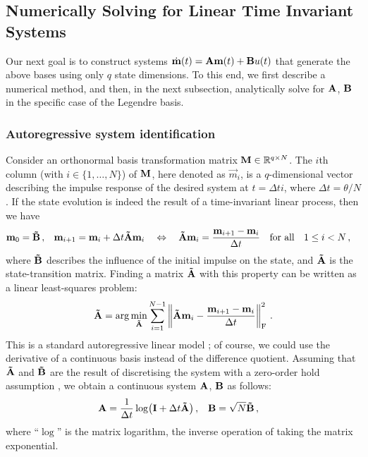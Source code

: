 \subsection{Numerically Solving for Linear Time Invariant Systems}
\label{sec:lti_autoregression}

Our next goal is to construct \LTI systems $\dot{\mathbf{m}}(t) = \mathbf{A} \mathbf{m}(t) + \mathbf{B} u(t)$ that generate the above bases using only $q$ state dimensions.
To this end, we first describe a numerical method, and then, in the next subsection, analytically solve for $\mathbf{A}$, $\mathbf{B}$ in the specific case of the Legendre basis.

\subsubsection{Autoregressive system identification}
Consider an orthonormal basis transformation matrix $\mathbf{M} \in \mathbb{R}^{q \times N}$. The $i$th column (with $i \in \{1, \ldots, N\}$) of $\mathbf{M}$, here denoted as $\vec m_i$, is a $q$-dimensional vector describing the impulse response of the desired system at $t = \Delta t i$, where $\Delta t = \theta / N$.
If the state evolution is indeed the result of a time-invariant linear process, then we have
\begin{align*}
	\mathbf{m}_0 &= \mathbf{\tilde B} \,, &
	\mathbf{m}_{i + 1} &= \mathbf{m}_{i} + \Delta t \mathbf{\tilde A} \mathbf{m}_i
	\quad \Leftrightarrow \quad
	\mathbf{\tilde A} \mathbf{m}_{i} = \frac{\mathbf{m}_{i + 1} - \mathbf{m}_i}{\Delta t} \quad \text{for all} \quad 1 \leq i < N \,,
\end{align*}
where $\mathbf{\tilde B}$ describes the influence of the initial impulse on the state, and $\mathbf{\tilde A}$ is the state-transition matrix.
Finding a matrix $\mathbf{\tilde A}$ with this property can be written as a linear least-squares problem:
\begin{align}
	\mathbf{\tilde A} = \arg\min_{\mathbf{\tilde A}} \sum_{i = 1}^{N - 1} \left\| \mathbf{\tilde A} \mathbf{m}_i - \frac{\mathbf{m}_{i + 1} - \mathbf{m}_i}{\Delta t} \right\|_\mathrm{F}^2 \,.
	\label{eqn:construct_lti_lstsq}
\end{align}
This is a standard autoregressive linear model \citep[cf.][Chapter~8]{verhaegen2007filtering}; of course, we could use the derivative of a continuous basis instead of the difference quotient.
Assuming that $\mathbf{\tilde A}$ and $\mathbf{\tilde B}$ are the result of discretising the \LTI system with a zero-order hold assumption \citep[e.g.,][Section~9.8]{brogan1991modern}, we obtain a continuous system $\mathbf{A}$, $\mathbf{B}$ as follows:
\begin{align}
 	\mathbf{A} &= \frac{1}{\Delta t} \log\bigl(\mathbf{I}  + \Delta t \mathbf{\tilde A}\bigr) \,, &
 	\mathbf{B} &= \sqrt{N} \mathbf{\tilde B} \,,
 	\label{eqn:lti_inverse_discretisation}
\end{align}
where \enquote{$\log$} is the matrix logarithm, the inverse operation of taking the matrix exponential.

